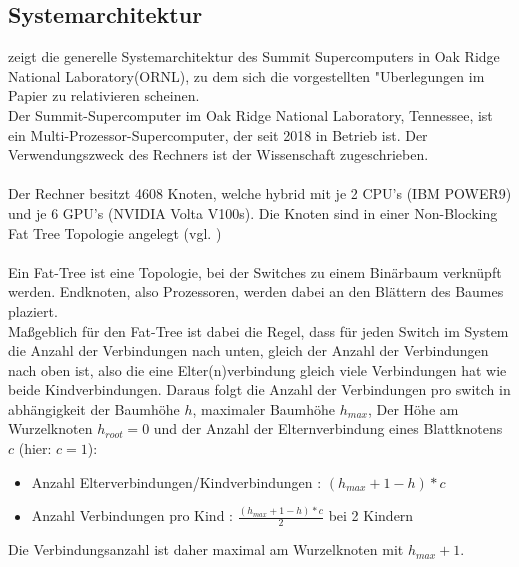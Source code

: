 \subsection{Systemarchitektur}
\cite[Abb. 1]{mainpaper} zeigt die generelle Systemarchitektur des Summit Supercomputers in Oak Ridge National Laboratory(ORNL), zu dem sich die vorgestellten "Uberlegungen im Papier zu relativieren scheinen.\\
Der Summit-Supercomputer im Oak Ridge National Laboratory, Tennessee, ist ein Multi-Prozessor-Supercomputer, der seit 2018 in Betrieb ist. Der Verwendungszweck des Rechners ist der Wissenschaft zugeschrieben.\\
\\
Der Rechner besitzt 4608 Knoten, welche hybrid mit je 2 CPU's (IBM POWER9) und je 6 GPU's (NVIDIA Volta V100s). Die Knoten sind in einer Non-Blocking Fat Tree Topologie angelegt (vgl. \cite{osummit})\\
\\
Ein Fat-Tree ist eine Topologie, bei der Switches zu einem Binärbaum verknüpft werden. Endknoten, also Prozessoren, werden dabei an den Blättern des Baumes plaziert.\\
Maßgeblich für den Fat-Tree ist dabei die Regel, dass für jeden Switch im System die Anzahl der Verbindungen nach unten, gleich der Anzahl der Verbindungen nach oben ist, also die eine Elter(n)verbindung gleich viele Verbindungen hat wie beide Kindverbindungen. Daraus folgt die Anzahl der Verbindungen pro switch in abhängigkeit der Baumhöhe $h$, maximaler Baumhöhe $h_{max}$, Der Höhe am Wurzelknoten $h_{root}=0$ und der Anzahl der Elternverbindung eines Blattknotens $c$ (hier: $c=1$):
\begin{itemize}
	\item Anzahl Elterverbindungen/Kindverbindungen : $(h_{max}+1-h)*c$
	\item Anzahl Verbindungen pro Kind : $\frac{(h_{max}+1-h)*c}{2}$ bei 2 Kindern
\end{itemize}
Die Verbindungsanzahl ist daher maximal am Wurzelknoten mit $h_{max}+1$.

